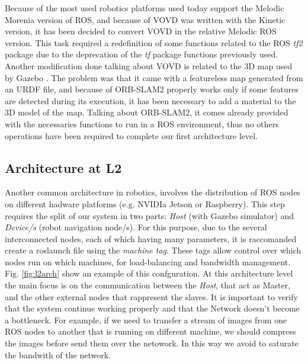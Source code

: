 Because of the most used robotics platforms used today support the Melodic Morenia \cite{rosmelodic} version of ROS, and because of VOVD was written with the Kinetic version, it has been decided to convert VOVD in the relative Melodic ROS version. This task required a redefinition of some functions related to the ROS \textit{tf2} package \cite{tfros} due to the deprecation of the \textit{tf} package functions previously used. 
Another modification done talking about VOVD is related to the 3D map used by Gazebo \cite{Gazebo}. The problem was that it came with a featureless map generated from an URDF file, and because of ORB-SLAM2 properly works only if some features are detected during its execution, it has been necessary to add a material to the 3D model of the map.
Talking about ORB-SLAM2, it comes already provided with the necessaries functions to run in a ROS environment, thus no others operations have been required to complete our first architecture level.



\subsection{Architecture at L2} %
Another common architecture in robotics, involves the distribution of ROS nodes on different hadware platforms (e.g. NVIDIa Jetson or Raspberry). 
This step requires the split of our system in two parts: \textit{Host} (with Gazebo simulator) and \textit{Device/s} (robot navigation node/s). For this purpose, due to the several interconnected nodes, each of which having many parameters, it is raccomanded create a roslaunch file  using the \textit{machine tag}. These tags allow control over which nodes run on which machines, for load-balancing and bandwidth management. Fig. \ref{fig:l2arch} show an example of this confguration. At this architecture level the main focus is on the communication between the \textit{Host}, that act as Master, and the other external  nodes that rappresent the slaves. It is important to verify that the system continue working properly and that the Network doesn't become a bottleneck. For example, if we need to transfer a stream of images from one ROS nodes to another that is running on different machine, we should compress the images before send them over the netowork. In this way we avoid to saturate the bandwith of the network.

